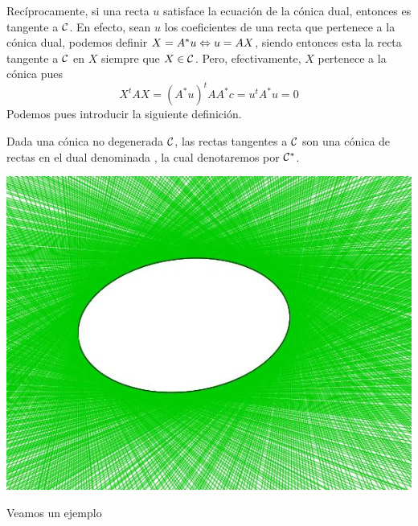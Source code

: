 Recíprocamente, si una recta $u$ satisface la ecuación de la cónica dual, entonces es tangente a $\mathcal{C}$. En efecto, sean $u$ los coeficientes de una recta que pertenece a la cónica dual, podemos definir $X=A^*u\Leftrightarrow u=AX$, siendo entonces esta la recta tangente a $\mathcal{C}$ en $X$ siempre que $X\in \mathcal{C}$. Pero, efectivamente, $X$ pertenece a la cónica pues
\[X^tAX=(A^*u)^tAA^*c=u^tA^*u=0\] 
Podemos pues introducir la siguiente definición.
\begin{defi}
	Dada una cónica no degenerada $\mathcal{C}$, las rectas tangentes a $\mathcal{C}$ son una cónica de rectas en el dual denominada , la cual denotaremos por $\mathcal{C}^*$.
\end{defi}
\begin{center}
	\includegraphics[scale=.45]{Graficos/Conicas/ConicaDual.jpg}
\end{center}
Veamos un ejemplo

